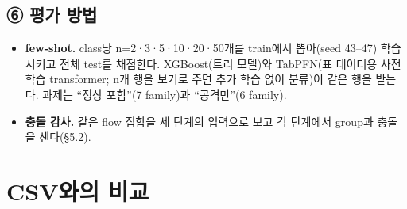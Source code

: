\subsection{⑥ 평가 방법}
\begin{itemize}
\item \textbf{few-shot.} class당 n=2·3·5·10·20·50개를 train에서 뽑아(seed 43--47) 학습시키고 전체 test를 채점한다. XGBoost(트리 모델)와 TabPFN(표 데이터용 사전학습 transformer; n개 행을 보기로 주면 추가 학습 없이 분류)이 같은 행을 받는다. 과제는 ``정상 포함''(7 family)과 ``공격만''(6 family).
\item \textbf{충돌 감사.} 같은 flow 집합을 세 단계의 입력으로 보고 각 단계에서 group과 충돌을 센다(\S5.2).
\end{itemize}

\section{CSV와의 비교}
